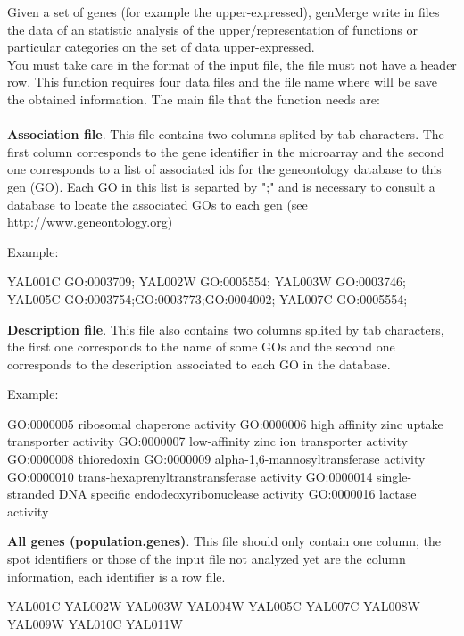 \documentclass[12pt]{article}
\begin{document}
Given a set of genes (for example the upper-expressed), genMerge write in files the data of an statistic analysis of the upper/representation of functions or particular categories on the set of data upper-expressed.\\

You must take care in the format of the input file, the file must not have a header row. This function requires four data files and the file name where will be save the obtained information. The main file that the function needs are:\\\\

\textbf{Association file}. This file contains two columns splited by tab characters. The first column corresponds to the gene identifier in the microarray and the second one corresponds to a list of associated ids for the geneontology database to this gen (GO). Each GO in this list is separted by ";" and is necessary to consult a database to locate the associated GOs to each gen (see http://www.geneontology.org)
\begin{Scode}
Example:

YAL001C GO:0003709;
YAL002W GO:0005554;
YAL003W GO:0003746;
YAL005C GO:0003754;GO:0003773;GO:0004002;
YAL007C GO:0005554;
\end{Scode}

\textbf{Description file}. This file also contains two columns splited by tab characters, the first one corresponds to the name of some GOs and the second one corresponds to the description associated to each GO in the database.
\begin{Scode}
Example:

GO:0000005      ribosomal chaperone activity
GO:0000006      high affinity zinc uptake transporter activity
GO:0000007      low-affinity zinc ion transporter activity
GO:0000008      thioredoxin
GO:0000009      alpha-1,6-mannosyltransferase activity
GO:0000010      trans-hexaprenyltranstransferase activity
GO:0000014      single-stranded DNA specific endodeoxyribonuclease activity
GO:0000016      lactase activity
\end{Scode}

\textbf{All genes (population.genes)}. This file should only contain one column, the spot identifiers or those of the input file not analyzed yet are the column information, each identifier is a row file. 
\begin{Scode}
YAL001C
YAL002W
YAL003W
YAL004W
YAL005C
YAL007C
YAL008W
YAL009W
YAL010C
YAL011W
\end{Scode}
\end{document}
